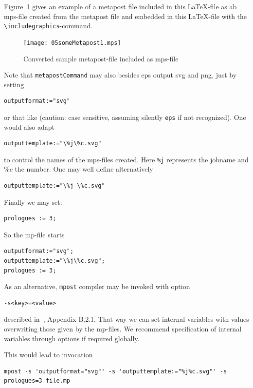 \documentclass[12pt]{article}
\begin{document}
Figure~\ref{fig:metapost} gives an example of a metapost file 
included in this \LaTeX-file as ab mps-file 
created from the metapost file 
and embedded in this \LaTeX-file 
with the {\tt\textbackslash includegraphics}-command. 

\begin{figure}[htb]
\begin{center}
\texttt{[image: 05someMetapost1.mps]}
\end{center}
\caption{\label{fig:metapost}
Converted sample metapost-file included as mps-file  }
\end{figure}

Note that {\tt metapostCommand} may also besides \gls{eps} 
output \gls{svg} and \gls{png}, 
just by setting 
%
\begin{verbatim}
outputformat:="svg" 
\end{verbatim}
%
or that like 
(caution: case sensitive, assuming silently {\tt eps} if not recognized). 
One would also adapt 
%
\begin{verbatim}
outputtemplate:="\%j\%c.svg"
\end{verbatim}
%
to control the names of the mps-files created. 
Here {\tt\%j} represents the jobname and $\%c$ the number. 
One may well define alternatively 
%
\begin{verbatim}
outputtemplate:="\%j-\%c.svg"
\end{verbatim}

Finally we may set: 
%
\begin{verbatim}
prologues := 3;
\end{verbatim}

So the mp-file starts 
%
\lstset{language=metapost, basicstyle=\normalsize}
\begin{lstlisting}
outputformat:="svg";
outputtemplate:="\%j\%c.svg";
prologues := 3;
\end{lstlisting}

As an alternative, {\tt mpost} compiler may be invoked with option 
%
\begin{verbatim}
-s<key>=<value>
\end{verbatim}
%
described in~\cite{MPost}, Appendix B.2.1. 
That way we can set internal variables with values 
overwriting those given by the mp-files. 
We recommend specification of internal variables through options 
if required globally. 

This would lead to invocation 
%
\begin{Verbatim}[fontsize=\scriptsize]
mpost -s 'outputformat="svg"' -s 'outputtemplate:="%j%c.svg"' -s prologues=3 file.mp
\end{Verbatim}
\end{document}
